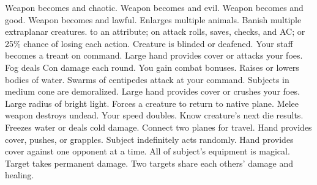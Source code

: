     {Weapon becomes  and chaotic.}
    {Weapon becomes  and evil.}
    {Weapon becomes  and good.}
    {Weapon becomes  and lawful.}
    {Enlarges multiple animals.}
    {Banish multiple extraplanar creatures. }
    { to an attribute;  on attack rolls, saves, checks, and AC; or 25\% chance of losing each action.}
    {Creature is blinded or deafened.}
    {Your staff becomes a treant on command.}
    {Large hand provides cover or attacks your foes.}
    {Fog deals Con damage each round.}
    {You gain combat bonuses.}
    {Raises or lowers bodies of water.}
    {Swarms of centipedes attack at your command.}
    {Subjects in medium cone are demoralized.}
    {Large hand provides cover or crushes your foes.}
    {Large radius of bright light.}
    {Forces a creature to return to native plane.}
    {Melee weapon destroys undead.}
    {Your speed doubles.}
    {Know creature's next die results.}
    {Freezes water or deals cold damage.}
    {Connect two planes for travel.}
    {Hand provides cover, pushes, or grapples.}
    {Subject indefinitely acts randomly.}
    {Hand provides cover against one opponent at a time.}
    {All of subject's equipment is magical.}
    {Target takes permanent damage.}
    {Two targets share each others' damage and healing.}
